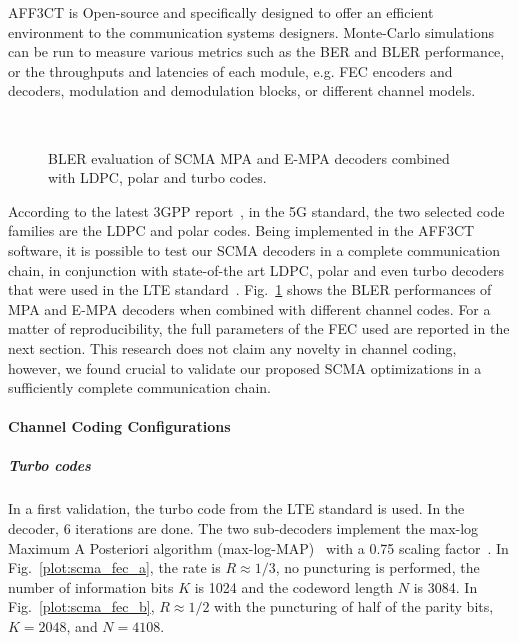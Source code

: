AFF3CT is Open-source and specifically designed to offer an efficient
environment to the communication systems designers. Monte-Carlo simulations can
be run to measure various metrics such as the BER and BLER performance, or the
throughputs and latencies of each module, e.g. FEC encoders and decoders,
modulation and demodulation blocks, or different channel models.

\begin{figure}
  \centering
  \\
  \centering
  \caption{BLER evaluation of SCMA MPA and E-MPA decoders combined with LDPC,
           polar and turbo codes.}
  \label{plot:scma_fec}
\end{figure}

According to the latest 3GPP report~\cite{ETSI2018}, in the 5G standard, the
two selected code families are the LDPC and polar codes. Being implemented in
the AFF3CT software, it is possible to test our SCMA decoders in a complete
communication chain, in conjunction with state-of-the art LDPC, polar and even
turbo decoders that were used in the LTE standard~\cite{ETSI2013}.
Fig.~\ref{plot:scma_fec} shows the BLER performances of MPA and E-MPA decoders
when combined with different channel codes. For a matter of reproducibility, the
full parameters of the FEC used are reported in the next section. This research
does not claim any novelty in channel coding, however, we found crucial to
validate our proposed SCMA optimizations in a sufficiently complete
communication chain.

\paragraph{Channel Coding Configurations}
\label{sec:scma_fec_characteristics}

\subparagraph{Turbo codes}

In a first validation, the turbo code from the LTE standard is used. In the
decoder, 6 iterations are done. The two sub-decoders implement the max-log
Maximum A Posteriori algorithm (max-log-MAP)~\cite{Robertson1995} with a 0.75
scaling factor~\cite{Vogt2000}. In Fig.~\ref{plot:scma_fec_a}, the rate is
$R \approx 1/3$, no puncturing is performed, the number of information bits
$K$ is 1024 and the codeword length $N$ is 3084. In Fig.~\ref{plot:scma_fec_b},
$R \approx 1/2$ with the puncturing of half of the parity bits,
$K=2048$, and $N=4108$.

